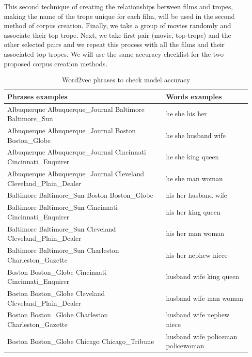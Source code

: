 \documentclass[letterpaper]{article}
\begin{document}
	This second technique of creating the relationships between films and tropes, making the name of the trope unique for each film, will be used in the second method of corpus creation. Finally, we take a group of movies randomly and associate their top trope. Next, we take first pair (movie, top-trope) and the other selected pairs and we repeat this process with all the films and their associated top tropes. We will use the same accuracy checklist for the two proposed corpus creation methods.   

	\begin{table}[ht]
		\centering
		\begin{tabular}{|p{0.65\linewidth}|p{0.35\linewidth}|}
			\hline
			\textbf{Phrases examples} & \textbf{Words examples}\\
			\hline	  
			Albuquerque Albuquerque\_Journal Baltimore Baltimore\_Sun & he she his her\\
			Albuquerque Albuquerque\_Journal Boston Boston\_Globe & he she husband wife\\
			Albuquerque Albuquerque\_Journal Cincinnati Cincinnati\_Enquirer & he she king queen\\
			Albuquerque Albuquerque\_Journal Cleveland Cleveland\_Plain\_Dealer & he she man woman\\
			\hline
			Baltimore Baltimore\_Sun Boston Boston\_Globe& his her husband wife\\
			Baltimore Baltimore\_Sun Cincinnati Cincinnati\_Enquirer & his her king queen\\
			Baltimore Baltimore\_Sun Cleveland Cleveland\_Plain\_Dealer & his her man woman\\
			Baltimore Baltimore\_Sun Charleston Charleston\_Gazette & his her nephew niece\\
			\hline
			Boston Boston\_Globe Cincinnati Cincinnati\_Enquirer & husband wife king queen	\\
			Boston Boston\_Globe Cleveland Cleveland\_Plain\_Dealer & husband wife man woman\\
			Boston Boston\_Globe Charleston Charleston\_Gazette & husband wife nephew niece\\
			Boston Boston\_Globe Chicago Chicago\_Tribune & husband wife policeman policewoman\\
			
			\hline
		\end{tabular}
		\caption{Word2vec phrases to check model accuracy}
		\label{tab:phrases-check-accuracy}
	\end{table}
	
\end{document}
